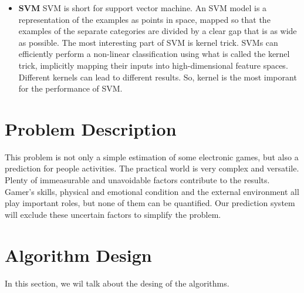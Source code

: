 \documentclass{article}
\begin{document}
\begin{itemize}
\item \textbf{SVM}
SVM is short for support vector machine.
An SVM model is a representation of the examples as points in space,
mapped so that the examples of the separate categories are divided
by a clear gap that is as wide as possible.
The most interesting part of SVM is kernel trick.
SVMs can efficiently perform a non-linear classification using what is called the kernel trick,
implicitly mapping their inputs into high-dimensional feature spaces.
Different kernels can lead to different results.
So, kernel is the most imporant for the performance of SVM.
\end{itemize}

\section{Problem Description}
This problem is not only a simple estimation of some electronic games,
but also a prediction for people activities.
The practical world is very complex and versatile.
Plenty of immeasurable and unavoidable factors contribute to the results.
Gamer’s skills, physical and emotional condition and the external environment all play important roles,
but none of them can be quantified.
Our prediction system will exclude these uncertain factors to simplify the problem.

\section{Algorithm Design}
In this section, we wil talk about the desing of the algorithms.
\end{document}
